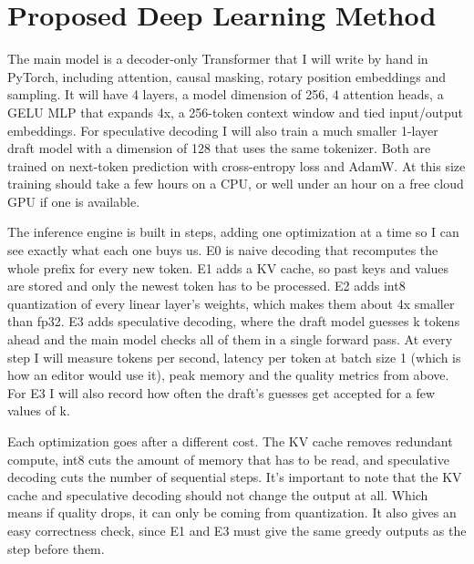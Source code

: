 \section{Proposed Deep Learning Method}
The main model is a decoder-only Transformer that I will write by hand in PyTorch, including attention, causal masking, rotary position embeddings \cite{su2024roformer} and sampling. It will have 4 layers, a model dimension of 256, 4 attention heads, a GELU MLP that expands 4x, a 256-token context window and tied input/output embeddings. For speculative decoding I will also train a much smaller 1-layer draft model with a dimension of 128 that uses the same tokenizer. Both are trained on next-token prediction with cross-entropy loss and AdamW. At this size training should take a few hours on a CPU, or well under an hour on a free cloud GPU if one is available.

The inference engine is built in steps, adding one optimization at a time so I can see exactly what each one buys us. E0 is naive decoding that recomputes the whole prefix for every new token. E1 adds a KV cache, so past keys and values are stored and only the newest token has to be processed. E2 adds int8 quantization of every linear layer's weights, which makes them about 4x smaller than fp32. E3 adds speculative decoding, where the draft model guesses k tokens ahead and the main model checks all of them in a single forward pass. At every step I will measure tokens per second, latency per token at batch size 1 (which is how an editor would use it), peak memory and the quality metrics from above. For E3 I will also record how often the draft's guesses get accepted for a few values of k.

Each optimization goes after a different cost. The KV cache removes redundant compute, int8 cuts the amount of memory that has to be read, and speculative decoding cuts the number of sequential steps. It's important to note that the KV cache and speculative decoding should not change the output at all. Which means if quality drops, it can only be coming from quantization. It also gives an easy correctness check, since E1 and E3 must give the same greedy outputs as the step before them.



